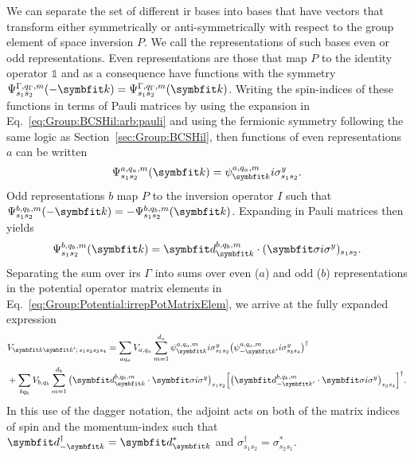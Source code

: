 We can separate the set of different \ac{ir} bases into bases that have vectors that transform either symmetrically or anti-symmetrically
with respect to the group element of space inversion $P$. We call the representations of such bases even or odd representations. Even representations are those that map
$P$ to the identity operator $\mathbb{1}$ and as a consequence have functions with the symmetry $\Psi^{\Gamma,q_\Gamma,m}_{s_1s_2}(-\v{k}) = \Psi^{\Gamma,q_\Gamma,m}_{s_1s_2}(\v{k})$. Writing
the spin-indices of these functions in terms of Pauli matrices by using the expansion in Eq.~\eqref{eq:Group:BCSHil:arb:pauli} and using the fermionic symmetry
following the same logic as Section~\ref{sec:Group:BCSHil}, then functions of even representations $a$ can be written
\begin{equation}
    \label{eq:Group:Potential:evenIrrepFunctions}
    \Psi^{a,q_a,m}_{s_1s_2}(\v{k}) = \psi^{a,q_a,m}_\v{k}i\sigma^y_{s_1s_2}.
\end{equation}
Odd representations $b$ map $P$ to the inversion operator $I$ such that $\Psi^{b,q_b,m}_{s_1s_2}(-\v{k}) = -\Psi^{b,q_b,m}_{s_1s_2}(\v{k})$. Expanding in Pauli
matrices then yields
\begin{equation}
    \label{eq:Group:Potential:oddIrrepFunctions}
    \Psi^{b,q_b,m}_{s_1s_2}(\v{k}) = \v{d}^{b,q_b,m}_{\v{k}}\cdot(\v{\sigma}i\sigma^y)_{s_1s_2}.
\end{equation}
Separating the sum over \ac{ir}s $\Gamma$ into sums over even ($a$) and odd ($b$) representations in the potential operator matrix elements in
Eq.~\eqref{eq:Group:Potential:irrepPotMatrixElem}, we arrive at the fully expanded expression
\begin{equation}
    \label{eq:Group:Potential:fullyExpandedPotMatrixElem}
    \begin{split}
        &V_{\v{k}\v{k}';\,s_1s_2s_3s_4} = \sum_{aq_a}V_{a,q_a}\sum_{m=1}^{d_a}\psi_\v{k}^{a,q_a,m}i\sigma^y_{s_1s_2}\big(\psi_{-\v{k}'}^{a,q_a,m}i\sigma^y_{s_3s_4}\big)^\dagger\\
        & + \sum_{bq_b}V_{b,q_b}\sum_{m=1}^{d_b}\big(\v{d}^{b,q_b,m}_{\v{k}}\cdot\v{\sigma}i\sigma^y\big)_{s_1s_2}\Big[\big(\v{d}^{b,q_b,m}_{-\v{k}'}\cdot\v{\sigma}i\sigma^y\big)_{s_3s_4}\Big]^\dagger.
    \end{split}
\end{equation}
In this use of the dagger notation, the adjoint acts on both of the matrix indices of spin and the momentum-index such that
$\v{d}_{-\v{k}}^\dagger = \v{d}_\v{k}^\ast$ and $\sigma_{s_1s_2}^\dagger = \sigma_{s_2s_1}^\ast$.

